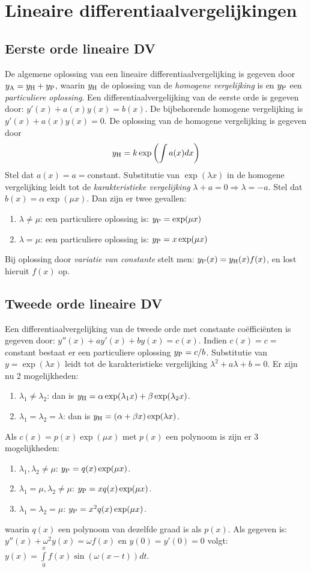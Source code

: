 \section{Lineaire differentiaalvergelijkingen}
\subsection{Eerste orde lineaire DV}
De algemene oplossing van een lineaire differentiaalvergelijking is
gegeven door $y_{\rm A}=y_{\rm H}+y_{\rm P}$, waarin $y_{\rm H}$ de oplossing
van de {\it homogene vergelijking} is en $y_{\rm P}$ een {\it particuliere
oplossing}.
\npar
Een differentiaalvergelijking van de eerste orde is gegeven door:
$y'(x)+a(x)y(x)=b(x)$. De bijbehorende homogene vergelijking is
$y'(x)+a(x)y(x)=0$.
\npar
De oplossing van de homogene vergelijking is gegeven door
\[
y_{\rm H}=k\exp\left(\int a(x)dx\right)
\]
Stel dat $a(x)=a=$constant.
\npar
Substitutie van $\exp(\lambda x)$ in de homogene vergelijking leidt tot de
{\it karakteristieke vergelijking} $\lambda+a=0\Rightarrow \lambda=-a$.
\npar
Stel dat $b(x)=\alpha\exp(\mu x)$. Dan zijn er twee gevallen:
\begin{enumerate}
\item $\lambda\neq\mu$: een particuliere oplossing is: $y_{\rm P}=\exp(\mu x)$
\item $\lambda=\mu$: een particuliere oplossing is: $y_{\rm P}=x\exp(\mu x)$
\end{enumerate}
\npar
Bij oplossing door {\it variatie van constante} stelt men:
$y_{\rm P}(x)=y_{\rm H}(x)f(x)$, en lost hieruit $f(x)$ op.

\subsection{Tweede orde lineaire DV}
Een differentiaalvergelijking van de tweede orde met constante
co\"effici\"enten is gegeven door: $y''(x)+ay'(x)+by(x)=c(x)$. Indien
$c(x)=c=$constant bestaat er een particuliere oplossing $y_{\rm P}=c/b$.
\npar
Substitutie van $y=\exp(\lambda x)$ leidt tot de karakteristieke vergelijking
$\lambda^2+a\lambda+b=0$.
\npar
Er zijn nu 2 mogelijkheden:
\begin{enumerate}
\item $\lambda_1\neq\lambda_2$: dan is $y_{\rm H}=\alpha\exp(\lambda_1 x)+\beta\exp(\lambda_2 x)$.
\item $\lambda_1=\lambda_2=\lambda$: dan is $y_{\rm H}=(\alpha +\beta x)\exp(\lambda x)$.
\end{enumerate}
\npar
Als $c(x)=p(x)\exp(\mu x)$ met $p(x)$ een polynoom is zijn er 3 mogelijkheden:
\begin{enumerate}
\item $\lambda_1,\lambda_2\neq\mu$: $y_{\rm P}=q(x)\exp(\mu x)$.
\item $\lambda_1=\mu,\lambda_2\neq\mu$: $y_{\rm P}=xq(x)\exp(\mu x)$.
\item $\lambda_1=\lambda_2=\mu$: $y_{\rm P}=x^2q(x)\exp(\mu x)$.
\end{enumerate}
waarin $q(x)$ een polynoom van dezelfde graad is als $p(x)$.
\npar
Als gegeven is: $y''(x)+\omega^2y(x)=\omega f(x)$ en $y(0)=y'(0)=0$ volgt:
$y(x)=\int\limits_0^xf(x)\sin(\omega(x-t))dt$.

